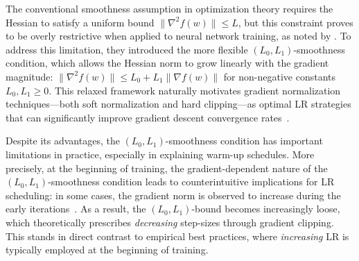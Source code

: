\documentclass[a4paper,11pt]{article}
\newcommand{\1}{\mathbbm{1}}
\theoremstyle{plain}
\begin{document}
The conventional smoothness assumption in optimization theory requires the Hessian to satisfy a uniform bound $\|\nabla^2 f(w)\| \leq L$, but this constraint proves to be overly restrictive when applied to neural network training, as noted by \citet{zhang2019gradient}. To address this limitation, they introduced the more flexible $(L_0, L_1)$-smoothness condition, which allows the Hessian norm to grow linearly with the gradient magnitude: $\|\nabla^2 f(w)\| \leq L_0 + L_1\|\nabla f(w)\|$ for non-negative constants $L_0, L_1 \geq 0$. This relaxed framework naturally motivates gradient normalization techniques---both soft normalization and hard clipping---as optimal LR strategies that can significantly improve gradient descent convergence rates~\citep{zhang2020improved,zhao2021convergence,faw2023beyond,wang2023convergence,gorbunov2024methods,vankov2024optimizing,li2023convex}.


Despite its advantages, the $(L_0, L_1)$-smoothness condition has important limitations in practice, especially in explaining warm-up schedules. More precisely, at the beginning of training, the gradient-dependent nature of the $(L_0, L_1)$-smoothness condition leads to counterintuitive implications for LR scheduling: in some cases, the gradient norm is observed to increase during the early iterations~\citep{xie2023overlooked, defazio2023optimal, defazio2025gradients}. As a result, the $(L_0, L_1)$-bound becomes increasingly loose, which theoretically prescribes \emph{decreasing} step-sizes through gradient clipping. This stands in direct contrast to empirical best practices, where \emph{increasing} LR is typically employed at the beginning of training. 
\end{document}

